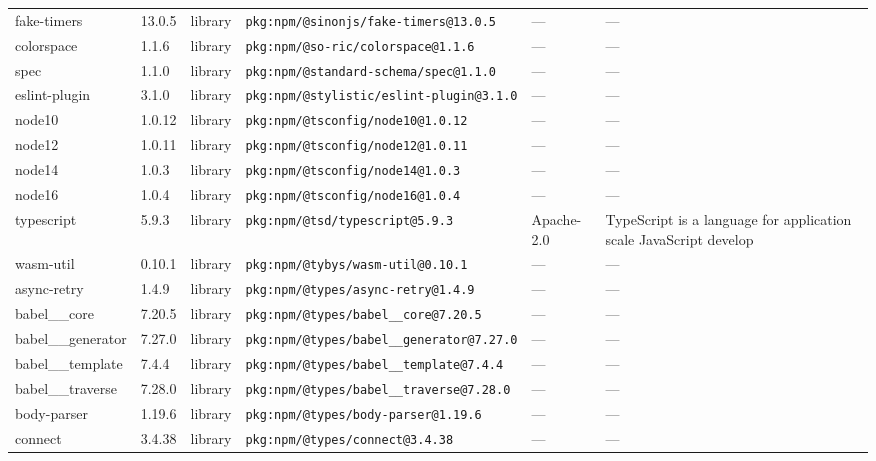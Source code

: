 \documentclass[11pt,a4paper]{article}
\begin{document}
\begin{longtable}{|p{4cm}|p{2cm}|p{1.6cm}|p{5cm}|p{1.5cm}|p{3.5cm}|}
\raggedright fake-timers & 13.0.5 & library & \small\texttt{pkg:npm/@sinonjs/fake-timers@13.0.5} & — & \small — \\
\raggedright colorspace & 1.1.6 & library & \small\texttt{pkg:npm/@so-ric/colorspace@1.1.6} & — & \small — \\
\raggedright spec & 1.1.0 & library & \small\texttt{pkg:npm/@standard-schema/spec@1.1.0} & — & \small — \\
\raggedright eslint-plugin & 3.1.0 & library & \small\texttt{pkg:npm/@stylistic/eslint-plugin@3.1.0} & — & \small — \\
\raggedright node10 & 1.0.12 & library & \small\texttt{pkg:npm/@tsconfig/node10@1.0.12} & — & \small — \\
\raggedright node12 & 1.0.11 & library & \small\texttt{pkg:npm/@tsconfig/node12@1.0.11} & — & \small — \\
\raggedright node14 & 1.0.3 & library & \small\texttt{pkg:npm/@tsconfig/node14@1.0.3} & — & \small — \\
\raggedright node16 & 1.0.4 & library & \small\texttt{pkg:npm/@tsconfig/node16@1.0.4} & — & \small — \\
\raggedright typescript & 5.9.3 & library & \small\texttt{pkg:npm/@tsd/typescript@5.9.3} & Apache-2.0 & \small TypeScript is a language for application scale JavaScript develop \\
\raggedright wasm-util & 0.10.1 & library & \small\texttt{pkg:npm/@tybys/wasm-util@0.10.1} & — & \small — \\
\raggedright async-retry & 1.4.9 & library & \small\texttt{pkg:npm/@types/async-retry@1.4.9} & — & \small — \\
\raggedright babel\_\_core & 7.20.5 & library & \small\texttt{pkg:npm/@types/babel\_\_core@7.20.5} & — & \small — \\
\raggedright babel\_\_generator & 7.27.0 & library & \small\texttt{pkg:npm/@types/babel\_\_generator@7.27.0} & — & \small — \\
\raggedright babel\_\_template & 7.4.4 & library & \small\texttt{pkg:npm/@types/babel\_\_template@7.4.4} & — & \small — \\
\raggedright babel\_\_traverse & 7.28.0 & library & \small\texttt{pkg:npm/@types/babel\_\_traverse@7.28.0} & — & \small — \\
\raggedright body-parser & 1.19.6 & library & \small\texttt{pkg:npm/@types/body-parser@1.19.6} & — & \small — \\
\raggedright connect & 3.4.38 & library & \small\texttt{pkg:npm/@types/connect@3.4.38} & — & \small — \\

\end{longtable}
\end{document}
